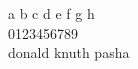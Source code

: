 \parindent=0pt

\null \vskip -2cm
\setfarsi \novocalize \Large
%
\begin{arabtext}
a b c d e f g h  \\
0123456789\\
donald knuth pasha\\
\end{arabtext}
%
\testoutput

